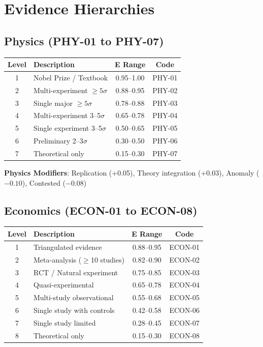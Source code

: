 \documentclass[11pt,a4paper]{article}
\begin{document}
\newpage
\section{Evidence Hierarchies}

\subsection{Physics (PHY-01 to PHY-07)}

\begin{center}
\begin{tabular}{clcc}
\toprule
\textbf{Level} & \textbf{Description} & \textbf{E Range} & \textbf{Code} \\
\midrule
1 & Nobel Prize / Textbook & 0.95--1.00 & PHY-01 \\
2 & Multi-experiment $\geq 5\sigma$ & 0.88--0.95 & PHY-02 \\
3 & Single major $\geq 5\sigma$ & 0.78--0.88 & PHY-03 \\
4 & Multi-experiment 3--5$\sigma$ & 0.65--0.78 & PHY-04 \\
5 & Single experiment 3--5$\sigma$ & 0.50--0.65 & PHY-05 \\
6 & Preliminary 2--3$\sigma$ & 0.30--0.50 & PHY-06 \\
7 & Theoretical only & 0.15--0.30 & PHY-07 \\
\bottomrule
\end{tabular}
\end{center}

\textbf{Physics Modifiers}: Replication (+0.05), Theory integration (+0.03), Anomaly ($-0.10$), Contested ($-0.08$)

\subsection{Economics (ECON-01 to ECON-08)}

\begin{center}
\begin{tabular}{clcc}
\toprule
\textbf{Level} & \textbf{Description} & \textbf{E Range} & \textbf{Code} \\
\midrule
1 & Triangulated evidence & 0.88--0.95 & ECON-01 \\
2 & Meta-analysis ($\geq$10 studies) & 0.82--0.90 & ECON-02 \\
3 & RCT / Natural experiment & 0.75--0.85 & ECON-03 \\
4 & Quasi-experimental & 0.65--0.78 & ECON-04 \\
5 & Multi-study observational & 0.55--0.68 & ECON-05 \\
6 & Single study with controls & 0.42--0.58 & ECON-06 \\
7 & Single study limited & 0.28--0.45 & ECON-07 \\
8 & Theoretical only & 0.15--0.30 & ECON-08 \\
\bottomrule
\end{tabular}
\end{center}
\end{document}

